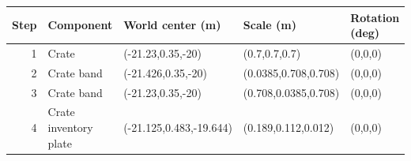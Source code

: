 \begin{center}\normalsize\begin{tabular}{rllll}\toprule
Step & Component & World center (m) & Scale (m) & Rotation (deg) \\\midrule
1 & Crate & (-21.23,0.35,-20) & (0.7,0.7,0.7) & (0,0,0) \\
2 & Crate band & (-21.426,0.35,-20) & (0.0385,0.708,0.708) & (0,0,0) \\
3 & Crate band & (-21.23,0.35,-20) & (0.708,0.0385,0.708) & (0,0,0) \\
4 & Crate inventory plate & (-21.125,0.483,-19.644) & (0.189,0.112,0.012) & (0,0,0) \\
\bottomrule\end{tabular}\end{center}
